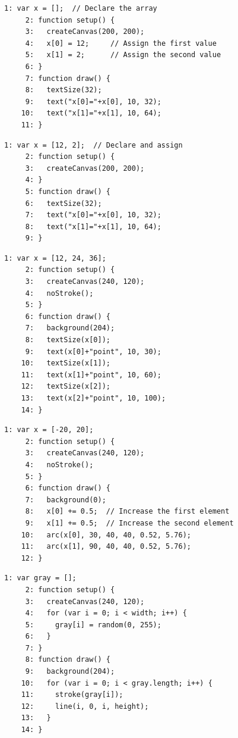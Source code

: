 \documentclass[a4j]{ltjsarticle}
\begin{document}
\vspace{1in}
\begin{lstlisting}[caption=Ex\_11\_04.js]
     1: var x = [];  // Declare the array
     2: function setup() {
     3:   createCanvas(200, 200);
     4:   x[0] = 12;     // Assign the first value
     5:   x[1] = 2;      // Assign the second value
     6: }
     7: function draw() {
     8:   textSize(32);
     9:   text("x[0]="+x[0], 10, 32);
    10:   text("x[1]="+x[1], 10, 64);
    11: }
\end{lstlisting}
\vspace{1in}
\begin{lstlisting}[caption=Ex\_11\_05.js]
     1: var x = [12, 2];  // Declare and assign
     2: function setup() {
     3:   createCanvas(200, 200);
     4: }
     5: function draw() {
     6:   textSize(32);
     7:   text("x[0]="+x[0], 10, 32);
     8:   text("x[1]="+x[1], 10, 64);
     9: }
\end{lstlisting}
\vspace{1in}
\begin{lstlisting}[caption=Ex\_11\_06.js]
     1: var x = [12, 24, 36];
     2: function setup() {
     3:   createCanvas(240, 120);
     4:   noStroke();
     5: }
     6: function draw() {
     7:   background(204);
     8:   textSize(x[0]);
     9:   text(x[0]+"point", 10, 30);
    10:   textSize(x[1]);
    11:   text(x[1]+"point", 10, 60);
    12:   textSize(x[2]);
    13:   text(x[2]+"point", 10, 100);
    14: }
\end{lstlisting}
\vspace{1in}
\begin{lstlisting}[caption=Ex\_11\_07.js]
     1: var x = [-20, 20];
     2: function setup() {
     3:   createCanvas(240, 120);
     4:   noStroke();
     5: }
     6: function draw() {
     7:   background(0);
     8:   x[0] += 0.5;  // Increase the first element
     9:   x[1] += 0.5;  // Increase the second element
    10:   arc(x[0], 30, 40, 40, 0.52, 5.76);
    11:   arc(x[1], 90, 40, 40, 0.52, 5.76);
    12: }
\end{lstlisting}
\vspace{1in}
\begin{lstlisting}[caption=Ex\_11\_08.js]
     1: var gray = [];
     2: function setup() {
     3:   createCanvas(240, 120);
     4:   for (var i = 0; i < width; i++) {
     5:     gray[i] = random(0, 255);
     6:   }
     7: }
     8: function draw() {
     9:   background(204);
    10:   for (var i = 0; i < gray.length; i++) {
    11:     stroke(gray[i]);
    12:     line(i, 0, i, height);
    13:   }
    14: }
\end{lstlisting}
\end{document}
